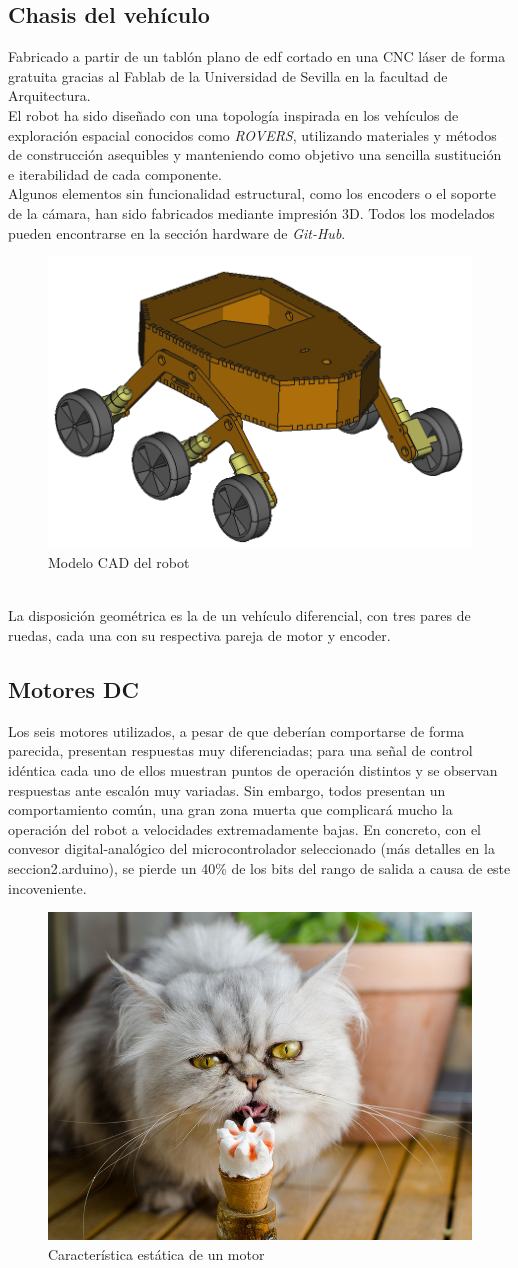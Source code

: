\subsection{Chasis del vehículo}
Fabricado a partir de un tablón plano de edf cortado en una CNC láser de forma gratuita gracias al Fablab de la Universidad de Sevilla en la facultad de Arquitectura. \\
El robot ha sido diseñado con una topología inspirada en los vehículos de exploración espacial conocidos como \textit{ROVERS}, utilizando materiales y métodos de construcción asequibles y
manteniendo como objetivo una sencilla sustitución e iterabilidad de cada componente. \\
Algunos elementos sin funcionalidad estructural, como los encoders o el soporte de la cámara, han sido fabricados mediante impresión 3D. Todos los modelados pueden encontrarse en la sección
hardware de \textit{Git-Hub}.
\begin{figure}[h!]
	\centering
	\includegraphics[width=.5\textwidth]{images/hw/wheele_stl}
	\caption{Modelo CAD del robot}
\end{figure}
\\
La disposición geométrica es la de un vehículo diferencial, con tres pares de ruedas, cada una con su respectiva pareja de motor y encoder.\\

\subsection{Motores DC}
 Los seis motores utilizados, a pesar de que deberían comportarse de forma parecida, presentan respuestas muy diferenciadas; para una señal de control idéntica cada uno de ellos muestran puntos de operación distintos y se observan respuestas ante escalón muy variadas. Sin embargo, 
 todos presentan un comportamiento común, una gran zona muerta que complicará mucho la operación del robot a velocidades extremadamente bajas. En concreto, con el convesor digital-analógico del microcontrolador seleccionado (más detalles en la seccion2.arduino), se pierde un 40\% de los bits del rango de salida a causa de este incoveniente.  
 \begin{figure}[h!]
 	\centering
 	\includegraphics[width=.3\textwidth]{images/hw/motor_est}
 	\caption{Característica estática de un motor}
 \end{figure}
 \newpage

